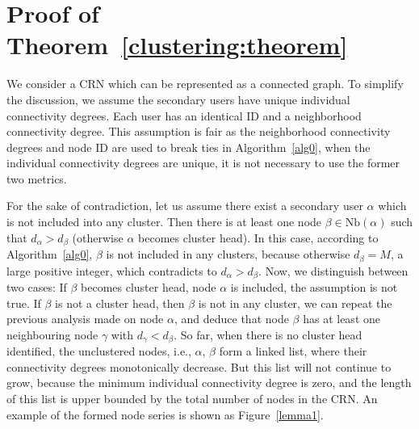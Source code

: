 \documentclass[10pt,journal,compsoc]{IEEEtran}
\makeatletter
\theoremstyle{mytheoremstyle}
\theoremstyle{mytheoremstyle}
\theoremstyle{mytheoremstyle}
\renewenvironment{proof}[1][\proofname]{%
      \par\pushQED{\qed}\fontfamily{ptm}\selectfont%
      \topsep6\p@\@plus6\p@\relax
      \trivlist\item[\hskip\labelsep\bfseries#1\@addpunct{.}]%
      \ignorespaces
    }{%
      \popQED\endtrivlist\@endpefalse
    }
\newcommand{\ie}{i.e., }
\makeatother
\begin{document}
\section{Proof of Theorem~\ref{clustering:theorem}}
\begin{proof}
\label{proof_clustering:theorem}
We consider a CRN which can be represented as a connected graph.
To simplify the discussion, we assume the secondary users have unique individual connectivity degrees. 
Each user has an identical ID and a neighborhood connectivity degree.
This assumption is fair as the neighborhood connectivity degrees and node ID are used to break ties in Algorithm~\ref{alg0}, when the individual connectivity degrees are unique, it is not necessary to use the former two metrics. 

For the sake of contradiction, let us assume there exist a secondary user $\alpha$ which is not included into any cluster.
Then there is at least one node $\beta\in \text{Nb}(\alpha)$ such that $d_{\alpha} > d_{\beta}$ (otherwise $\alpha$ becomes cluster head). 
In this case, according to Algorithm~\ref{alg0}, $\beta$ is not included in any clusters, because otherwise $d_{\beta} = M$, a large positive integer, which contradicts to $d_{\alpha} > d_{\beta}$.
Now, we distinguish between two cases: 
If $\beta$ becomes cluster head, node $\alpha$ is included, the assumption is not true.
If $\beta$ is not a cluster head, then $\beta$ is not in any cluster, we can repeat the previous analysis made on node $\alpha$, and deduce that node $\beta$ has at least one neighbouring node $\gamma$ with $d_{\gamma} < d_{\beta}$.
So far, when there is no cluster head identified, the unclustered nodes, \ie $\alpha$, $\beta$ form a linked list, where their connectivity degrees monotonically decrease.
But this list will not continue to grow, because the minimum individual connectivity degree is zero, and the length of this list is upper bounded by the total number of nodes in the CRN.
An example of the formed node series is shown as Figure~\ref{lemma1}.


\end{proof}
\end{document}
